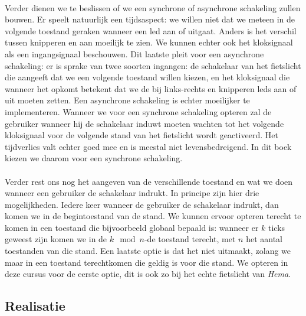 \paragraph{}
Verder dienen we te beslissen of we een synchrone of asynchrone schakeling zullen bouwen. Er speelt natuurlijk een tijdsaspect: we willen niet dat we meteen in de volgende toestand geraken wanneer een led aan of uitgaat. Anders is het verschil tussen knipperen en aan moeilijk te zien. We kunnen echter ook het kloksignaal als een ingangsignaal beschouwen. Dit laatste pleit voor een asynchrone schakeling: er is sprake van twee soorten ingangen: de schakelaar van het fietslicht die aangeeft dat we een volgende toestand willen kiezen, en het kloksignaal die wanneer het opkomt betekent dat we de bij links-rechts en knipperen leds aan of uit moeten zetten. Een asynchrone schakeling is echter moeilijker te implementeren. Wanneer we voor een synchrone schakeling opteren zal de gebruiker wanneer hij de schakelaar induwt moeten wachten tot het volgende kloksignaal voor de volgende stand van het fietslicht wordt geactiveerd. Het tijdverlies valt echter goed mee en is meestal niet levensbedreigend. In dit boek kiezen we daarom voor een synchrone schakeling.
\paragraph{}
Verder rest ons nog het aangeven van de verschillende toestand en wat we doen wanneer een gebruiker de schakelaar indrukt. In principe zijn hier drie mogelijkheden. Iedere keer wanneer de gebruiker de schakelaar indrukt, dan komen we in de begintoestand van de stand. We kunnen ervoor opteren terecht te komen in een toestand die bijvoorbeeld globaal bepaald is: wanneer er $k$ ticks geweest zijn komen we in de $k\mod n$-de toestand terecht, met $n$ het aantal toestanden van die stand. Een laatste optie is dat het niet uitmaakt, zolang we maar in een toestand terechtkomen die geldig is voor die stand. We opteren in deze cursus voor de eerste optie, dit is ook zo bij het echte fietslicht van \emph{Hema}.
\subsection{Realisatie}
